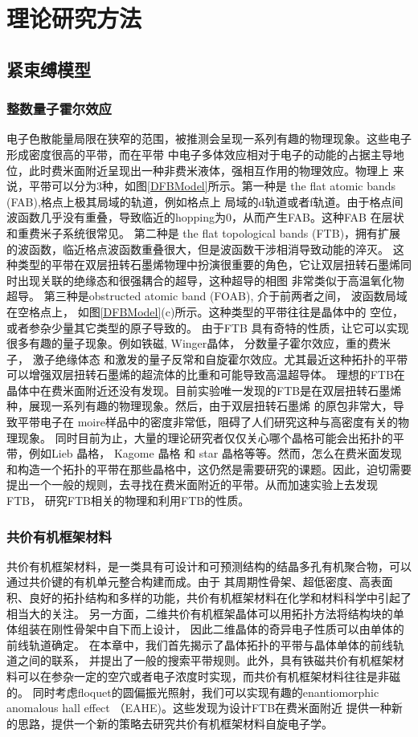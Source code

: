 \chapter{理论研究方法}

\section{紧束缚模型}

\subsection{整数量子霍尔效应}
电子色散能量局限在狭窄的范围，被推测会呈现一系列有趣的物理现象。这些电子形成密度很高的平带，而在平带
中电子多体效应相对于电子的动能的占据主导地位，此时费米面附近呈现出一种非费米液体，强相互作用的物理效应。物理上
来说，平带可以分为3种，如图\ref{DFBModel}所示。第一种是 the flat atomic bands (FAB),格点上极其局域的轨道，例如格点上
局域的d轨道或者f轨道。由于格点间波函数几乎没有重叠，导致临近的hopping为0，从而产生FAB。这种FAB 在层状和重费米子系统很常见。
第二种是 the flat topological bands (FTB)，拥有扩展的波函数，临近格点波函数重叠很大，但是波函数干涉相消导致动能的淬灭。
这种类型的平带在双层扭转石墨烯物理中扮演很重要的角色，它让双层扭转石墨烯同时出现关联的绝缘态和很强耦合的超导，这种超导的相图
非常类似于高温氧化物超导。
第三种是obstructed atomic band (FOAB), 介于前两者之间， 波函数局域在空格点上， 如图\ref{DFBModel}(c)所示。这种类型的平带往往是晶体中的
空位，或者参杂少量其它类型的原子导致的。
由于FTB 具有奇特的性质，让它可以实现很多有趣的量子现象。例如铁磁, Winger晶体， 分数量子霍尔效应，重的费米子， 激子绝缘体态
和激发的量子反常和自旋霍尔效应。尤其最近这种拓扑的平带可以增强双层扭转石墨烯的超流体的比重和可能导致高温超导体。
理想的FTB在晶体中在费米面附近还没有发现。目前实验唯一发现的FTB是在双层扭转石墨烯种，展现一系列有趣的物理现象。然后，由于双层扭转石墨烯
的原包非常大，导致平带电子在 moire样品中的密度非常低，阻碍了人们研究这种与高密度有关的物理现象。
同时目前为止，大量的理论研究者仅仅关心哪个晶格可能会出拓扑的平带，例如Lieb 晶格， Kagome 晶格 和 star 晶格等等。然而，怎么在费米面发现
和构造一个拓扑的平带在那些晶格中，这仍然是需要研究的课题。因此，迫切需要提出一个一般的规则，去寻找在费米面附近的平带。从而加速实验上去发现FTB，
研究FTB相关的物理和利用FTB的性质。

\subsection{共价有机框架材料}
共价有机框架材料，是一类具有可设计和可预测结构的结晶多孔有机聚合物，可以通过共价键的有机单元整合构建而成。由于
其周期性骨架、超低密度、高表面积、良好的拓扑结构和多样的功能，共价有机框架材料在化学和材料科学中引起了相当大的关注。
另一方面，二维共价有机框架晶体可以用拓扑方法将结构块的单体组装在刚性骨架中自下而上设计，
因此二维晶体的奇异电子性质可以由单体的前线轨道确定。 在本章中，我们首先揭示了晶体拓扑的平带与晶体单体的前线轨道之间的联系，
并提出了一般的搜索平带规则。此外，具有铁磁共价有机框架材料可以在参杂一定的空穴或者电子浓度时实现，而共价有机框架材料往往是非磁的。
同时考虑floquet的圆偏振光照射，我们可以实现有趣的enantiomorphic anomalous hall effect （EAHE)。这些发现为设计FTB在费米面附近
提供一种新的思路，提供一个新的策略去研究共价有机框架材料自旋电子学。



